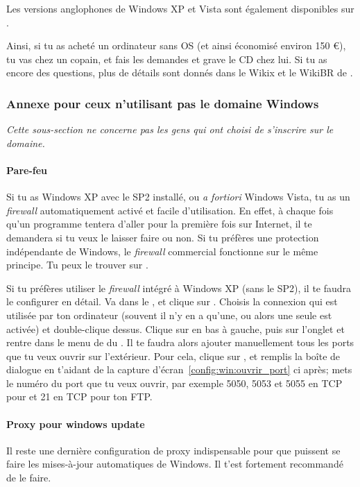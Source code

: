Les versions anglophones de Windows XP et Vista sont \'egalement disponibles sur .

Ainsi, si tu as achet\'e un ordinateur sans OS (et ainsi \'economis\'e environ 150 \euro), tu vas chez un copain, et fais les demandes et grave le CD chez lui. Si tu as encore des questions, plus de d\'etails sont donn\'es dans le Wikix et le WikiBR de \fkz.


\subsubsection{Annexe pour ceux n'utilisant pas le domaine Windows}

\label{horsdomaine} \emph{Cette sous-section ne concerne pas les gens qui ont choisi de s'inscrire sur le domaine.}

\paragraph{Pare-feu} Si tu as Windows XP avec le SP2 install\'e, ou \emph{a fortiori}
Windows Vista, tu as un \emph{firewall} automatiquement activ\'e et facile d'utilisation. En effet, \`a chaque fois qu'un programme tentera d'aller pour
la premi\`ere fois sur Internet, il te demandera si tu veux le laisser faire ou non. Si tu pr\'ef\`eres une protection ind\'ependante de Windows, le
\emph{firewall} commercial  fonctionne sur le m\^eme principe. Tu peux le trouver sur \xshare.

Si tu pr\'ef\`eres utiliser le \emph{firewall} int\'egr\'e \`a Windows XP (sans le SP2), il te faudra le configurer en d\'etail. Va dans le ,
 et clique sur . Choisis la connexion qui est utilis\'ee par ton ordinateur (souvent il n'y en a qu'une, ou
alors une seule est activ\'ee) et double-clique dessus. Clique sur  en bas \`a gauche, puis sur l'onglet  et rentre dans le
menu de  du . Il te faudra alors ajouter manuellement tous les ports que tu veux ouvrir sur l'ext\'erieur. Pour
cela, clique sur , et remplis la bo\^ite de dialogue en t'aidant de la capture d'\'ecran~\ref{config:win:ouvrir_port} ci apr\`es; mets le num\'ero du
port que tu veux ouvrir, par exemple 5050, 5053 et 5055 en TCP pour  et 21 en TCP pour ton FTP.

\paragraph{Proxy pour windows update} Il reste une derni\`ere configuration de
proxy indispensable pour que puissent se faire les mises-\`a-jour automatiques
de Windows. Il t'est fortement recommandé de le faire.

